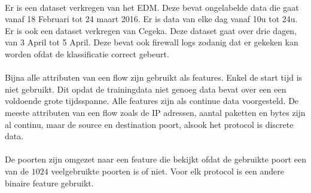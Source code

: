 \begin{samenvatting}
\\
Er is een dataset verkregen van het EDM. Deze bevat ongelabelde data die gaat vanaf 18 Februari tot 24 maart 2016. Er is data van elke dag vanaf 10u tot 24u. Er is ook een dataset verkregen van Cegeka. Deze dataset gaat over drie dagen, van 3 April tot 5 April. Deze bevat ook firewall logs zodanig dat er gekeken kan worden ofdat de klassificatie correct gebeurt.\\
\\
Bijna alle attributen van een flow zijn gebruikt als features. Enkel de start tijd is niet gebruikt. Dit opdat de trainingdata niet genoeg data bevat over een een voldoende grote tijdsspanne. Alle features zijn als continue data voorgesteld. De meeste attributen van een flow zoals de IP adressen, aantal paketten en bytes zijn al continu, maar de source en destination poort, alsook het protocol is discrete data.\\
\\
De poorten zijn omgezet naar een feature die bekijkt ofdat de gebruikte poort een van de $1024$ veelgebruikte poorten is of niet. Voor elk protocol is een andere binaire feature gebruikt. 


\end{samenvatting}
